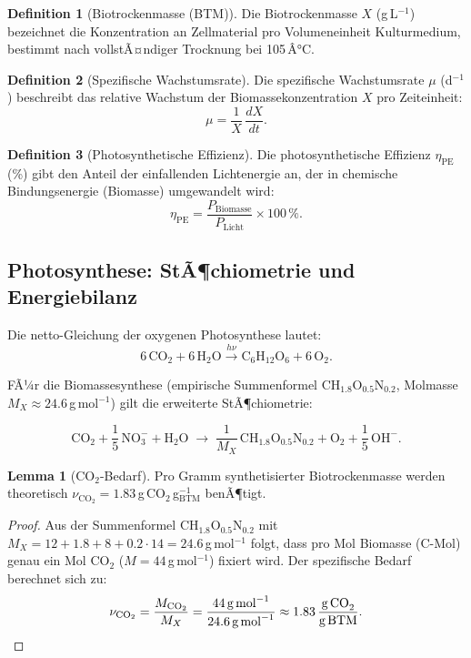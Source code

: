 ﻿\documentclass[a4paper,12pt]{article}
\theoremstyle{definition}
\newtheorem{definition}{Definition}
\newtheorem{lemma}{Lemma}
\begin{document}
\begin{definition}[Biotrockenmasse (BTM)]
	Die Biotrockenmasse $X$ (g\,L$^{-1}$) bezeichnet die Konzentration an Zellmaterial
	pro Volumeneinheit Kulturmedium, bestimmt nach vollstÃ¤ndiger Trocknung bei 105\,Â°C.
\end{definition}

\begin{definition}[Spezifische Wachstumsrate]
	Die spezifische Wachstumsrate $\mu$ (d$^{-1}$) beschreibt das relative Wachstum der
	Biomassekonzentration $X$ pro Zeiteinheit:
	\[
		\mu = \frac{1}{X}\,\frac{dX}{dt}.
	\]
\end{definition}

\begin{definition}[Photosynthetische Effizienz]
	Die photosynthetische Effizienz $\eta_\mathrm{PE}$ (\%) gibt den Anteil der einfallenden
	Lichtenergie an, der in chemische Bindungsenergie (Biomasse) umgewandelt wird:
	\[
		\eta_\mathrm{PE} = \frac{P_\mathrm{Biomasse}}{P_\mathrm{Licht}} \times 100\,\%.
	\]
\end{definition}

\subsection{Photosynthese: StÃ¶chiometrie und Energiebilanz}

Die netto-Gleichung der oxygenen Photosynthese lautet:
\[
	6\,\mathrm{CO}_2 + 6\,\mathrm{H}_2\mathrm{O}
	\xrightarrow{h\nu}
	\mathrm{C}_6\mathrm{H}_{12}\mathrm{O}_6 + 6\,\mathrm{O}_2.
\]

FÃ¼r die Biomassesynthese (empirische Summenformel $\mathrm{CH}_{1.8}\mathrm{O}_{0.5}\mathrm{N}_{0.2}$,
Molmasse $M_X \approx 24.6$\,g\,mol$^{-1}$) gilt die erweiterte StÃ¶chiometrie:

\begin{equation}
	\mathrm{CO}_2 + \frac{1}{5}\,\mathrm{NO}_3^- + \mathrm{H}_2\mathrm{O}
	\;\longrightarrow\;
	\frac{1}{M_X}\,\mathrm{C}\mathrm{H}_{1.8}\mathrm{O}_{0.5}\mathrm{N}_{0.2}
	+ \mathrm{O}_2 + \frac{1}{5}\,\mathrm{OH}^-.
	\label{eq:stoech}
\end{equation}

\begin{lemma}[$\mathrm{CO}_2$-Bedarf]
	Pro Gramm synthetisierter Biotrockenmasse werden theoretisch
	$\nu_{\mathrm{CO}_2} = 1.83$\,g\,\(\mathrm{CO}_2\)\,g$^{-1}_\mathrm{BTM}$ benÃ¶tigt.
\end{lemma}

\begin{proof}
	Aus der Summenformel $\mathrm{CH}_{1.8}\mathrm{O}_{0.5}\mathrm{N}_{0.2}$ mit
	$M_X = 12 + 1.8 + 8 + 0.2 \cdot 14 = 24.6$\,g\,mol$^{-1}$ folgt, dass
	pro Mol Biomasse (C-Mol) genau ein Mol $\mathrm{CO}_2$ ($M = 44$\,g\,mol$^{-1}$)
	fixiert wird. Der spezifische Bedarf berechnet sich zu:
	\[
		\nu_{\mathrm{CO}_2}
		= \frac{M_{\mathrm{CO}_2}}{M_X}
		= \frac{44\,\text{g\,mol}^{-1}}{24.6\,\text{g\,mol}^{-1}}
		\approx 1.83\,\frac{\text{g\,CO}_2}{\text{g\,BTM}}.
	\]
\end{proof}
\end{document}
